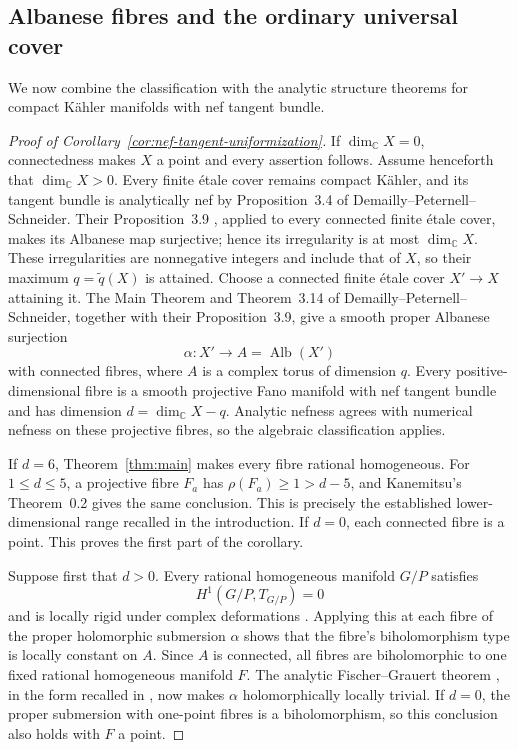 \subsection{Albanese fibres and the ordinary universal cover}

We now combine the classification with the analytic structure theorems
for compact K\"ahler manifolds with nef tangent bundle.

\begin{proof}[Proof of Corollary~\ref{cor:nef-tangent-uniformization}]
If $\dim_{\mathbb C}X=0$, connectedness makes $X$ a point and every
assertion follows. Assume henceforth that $\dim_{\mathbb C}X>0$.
Every finite \'{e}tale cover remains compact K\"ahler, and its tangent
bundle is analytically nef by Proposition~3.4 of
Demailly--Peternell--Schneider.
Their Proposition~3.9
\cite{DemaillyPeternellSchneider1994}, applied to every connected finite
\'{e}tale cover, makes its Albanese map surjective; hence its
irregularity is at most $\dim_{\mathbb C}X$. These irregularities are
nonnegative integers and include that of $X$, so their maximum
$q=\widetilde q(X)$ is attained.
Choose a connected finite \'{e}tale cover $X'\to X$ attaining it.
The Main Theorem and Theorem~3.14 of
Demailly--Peternell--Schneider, together with their Proposition~3.9,
give a smooth proper Albanese surjection
\[
 \alpha:X'\longrightarrow A=\operatorname{Alb}(X')
\]
with connected fibres, where $A$ is a complex torus of dimension $q$.
Every positive-dimensional fibre is a smooth projective Fano manifold
with nef tangent bundle and has dimension $d=\dim_{\mathbb C}X-q$.
Analytic nefness agrees with numerical nefness on these projective
fibres, so the algebraic classification applies.

If $d=6$, Theorem~\ref{thm:main} makes every fibre rational homogeneous.
For $1\leq d\leq5$, a projective fibre $F_a$ has
$\rho(F_a)\geq1>d-5$, and Kanemitsu's Theorem~0.2
\cite{Kanemitsu2016} gives the same conclusion. This is precisely the
established lower-dimensional range recalled in the introduction.
If $d=0$, each connected fibre is a point. This proves the first
part of the corollary.

Suppose first that $d>0$. Every rational homogeneous manifold $G/P$ satisfies
\[
 H^1(G/P,T_{G/P})=0
\]
and is locally rigid under complex deformations
\cite[Introduction and Section~3.7]{BienBrion1996}.
Applying this at each fibre of the proper
holomorphic submersion $\alpha$ shows that the fibre's biholomorphism
type is locally constant on $A$. Since $A$ is connected, all fibres
are biholomorphic to one fixed rational homogeneous manifold $F$.
The analytic Fischer--Grauert theorem
\cite{FischerGrauert1965}, in the form recalled in
\cite[Theorem~1.1]{Poczobut2025}, now makes $\alpha$ holomorphically
locally trivial. If $d=0$, the proper submersion with one-point fibres
is a biholomorphism, so this conclusion also holds with $F$ a point.


\end{proof}
